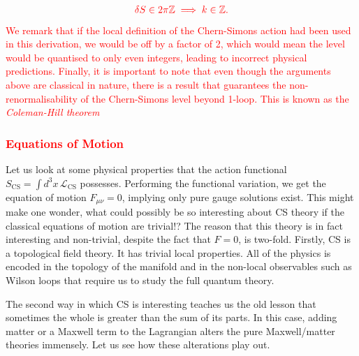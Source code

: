 \begin{align}
    \textcolor{red}{\delta S \in 2\pi \mathbb{Z} \implies k\in \mathbb{Z}.}
\end{align}
\textcolor{red}{We remark that if the local definition of the Chern-Simons action had been used in this derivation, we would be off by a factor of 2, which would mean the level would be quanti\textcolor{red}{s}ed to only even integers, leading to incorrect physical predictions. Finally, it \textcolor{red}{is} important to note that even though the arguments above are classical in nature, there is a result that guarantees the non-renormali\textcolor{red}{s}ability of the Chern-Simons level beyond 1-loop. This is known as the \textit{Coleman-Hill theorem} \cite{Coleman:1985zi, Khare:1994yv}  }
 \textcolor{red}{\subsubsection*{Equations of Motion}}
    Let us look at some physical properties that the action functional $S_{\text{CS}} = \int d^3x \, \mathcal{L}_{\text{CS}}$ possesses. Performing the functional variation, we get the equation of motion $F_{\mu \nu}=0$, implying only pure gauge solutions exist. This might make one wonder, what could possibly be so interesting about CS theory if the classical equations of motion are trivial!?
    The reason that this theory is in fact interesting and non-trivial, despite the fact that $F=0$, is two-fold. Firstly, CS is a topological field theory. It has trivial local properties. All of the physics is encoded in the topology of the manifold and in the non-local observables such as Wilson loops that require us to study the full quantum theory.

    The second way in which CS is interesting teaches us the old lesson that sometimes the whole is greater than the sum of its parts. In this case, adding matter or a Maxwell term to the Lagrangian alters the pure Maxwell/matter theories immensely. Let us see how these alterations play out.

